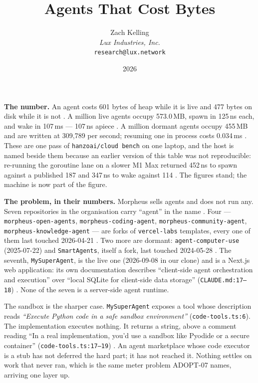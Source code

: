 \documentclass[11pt,a4paper]{article}
\title{Agents That Cost Bytes}
\author{Zach Kelling\\\textit{Lux Industries, Inc.}\\\texttt{research@lux.network}}
\date{2026}
\newcommand{\code}[1]{\texttt{\small #1}}
\newcommand{\prov}[1]{{\color{muted}\scriptsize\sffamily[#1]}}
\begin{document}
\luxcoverpage
\sloppy

\par
\vspace{0.9ex}

\noindent\textbf{The number.}
An agent costs 601 bytes of heap while it is live and 477 bytes on disk while it is not
\prov{measured}. A million live agents occupy 573.0\,MB, spawn in 125\,ns each, and wake in
107\,ms --- 107\,ns apiece \prov{measured}. A million dormant agents occupy 455\,MB and are
written at 309,789 per second; resuming one in process costs 0.034\,ms \prov{measured}. These
are one pass of \code{hanzoai/cloud bench} on one laptop, and the host is named beside them
because an earlier version of this table was not reproducible: re-running the goroutine lane on
a slower M1 Max returned 452\,ns to spawn against a published 187 and 347\,ns to wake against
114 \prov{verified}. The figures stand; the machine is now part of the figure.

\vspace{0.35ex}
\noindent\textbf{The problem, in their numbers.}
Morpheus sells agents and does not run any. Seven repositories in the organisation carry
``agent'' in the name \prov{verified 2026-09-17}. Four --- \code{morpheus-open-agents},
\code{morpheus-coding-agent}, \code{morpheus-community-agent},
\code{morpheus-knowledge-agent} --- are forks of \code{vercel-labs} templates, every one of
them last touched 2026-04-21 \prov{verified}. Two more are dormant:
\code{agent-computer-use} (2025-07-22) and \code{SmartAgents}, itself a fork, last touched
2024-05-28 \prov{verified}. The seventh, \code{MySuperAgent}, is the live one (2026-09-08 in
our clone) and is a Next.js web application: its own documentation describes ``client-side
agent orchestration and execution'' over ``local SQLite for client-side data storage''
(\code{CLAUDE.md:17--18}) \prov{verified}. None of the seven is a server-side agent runtime.

The sandbox is the sharper case. \code{MySuperAgent} exposes a tool whose description reads
\emph{``Execute Python code in a safe sandbox environment''} (\code{code-tools.ts:6}). The
implementation executes nothing. It returns a string, above a comment reading ``In a real
implementation, you'd use a sandbox like Pyodide or a secure container''
(\code{code-tools.ts:17--19}) \prov{verified}. An agent marketplace whose code executor is a
stub has not deferred the hard part; it has not reached it. Nothing settles on work that never
ran, which is the same meter problem ADOPT-07 names, arriving one layer up.
\end{document}
